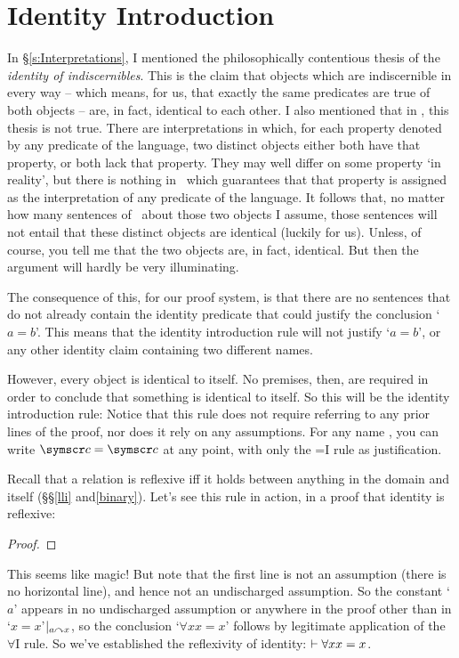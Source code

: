 \section{Identity Introduction}\label{idint}
In §\ref{s:Interpretations}, I mentioned the philosophically contentious thesis of the \emph{identity of indiscernibles}. This is the claim that objects which are indiscernible in every way – which means, for us, that exactly the same predicates are true of both objects – are, in fact, identical to each other. I also mentioned that in \FOL, this thesis is not true. There are interpretations in which, for each property denoted by any predicate of the language, two distinct objects either both have that property, or both lack that property. They may well differ on some property `in reality', but there is nothing in \FOL\ which guarantees that that property is assigned as the interpretation of any predicate of the language. 
It follows that, no matter how many sentences of \FOL\ about those two objects I assume, those sentences will not entail that these distinct objects are identical (luckily for us). Unless, of course, you tell me that the two objects are, in fact, identical. But then the argument will hardly be very illuminating.

The consequence of this, for our proof system, is that there are no sentences that do not already contain the identity predicate that could justify the conclusion `$a=b$'. This means that the identity introduction rule will not justify `$a=b$', or any other identity claim containing two different names.

However, every object is identical to itself. No premises, then, are required in order to conclude that something is identical to itself. So this will be the identity introduction rule:
Notice that this rule does not require referring to any prior lines of the proof, nor does it rely on any assumptions. For any name , you can write $\meta{c}=\meta{c}$ at any point, with only the {=}I rule as justification. 

Recall that a relation is reflexive iff it holds between anything in the domain and itself (§§\ref{lli} and\ref{binary}). Let's see this rule in action, in a proof that identity is reflexive:
\begin{proof}
	\idi{}
\end{proof} This seems like magic! But note that the first line is not an assumption (there is no horizontal line), and hence not an undischarged assumption. So the constant `$a$' appears in no undischarged assumption or anywhere in the proof other than in `$x=x$'$\vert_{a\curvearrowright x}$, so the conclusion `$\forall x x=x$' follows by legitimate application of the $\forall$I rule. So we've established the reflexivity of identity: $\vdash \forall x x=x$.

